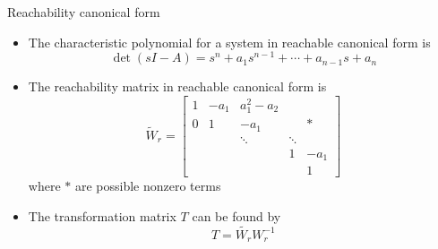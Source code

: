 \documentclass{beamer-control}
\begin{document}
\begin{frame}{Reachability canonical form}
\begin{itemize}
	\item The characteristic polynomial for a system in reachable canonical form is 
	\[\operatorname{det}(sI-A)= s^n+a_1s^{n-1}+\cdots + a_{n-1}s+a_n\]
	\item The reachability matrix in reachable canonical form is
	\[\tilde{W}_r = \begin{bmatrix}
		1 & -a_1 & a_1^2-a_2 & & \\
		0 & 1 & -a_1 & & * \\
		& & \ddots & \ddots & \\
		&  & & 1 & -a_1 \\
		& & & & 1
	\end{bmatrix}\]
	where $*$ are possible nonzero terms
	\item The transformation matrix $T$ can be found by 
	\[T=\tilde{W_r} W_r^{-1}\]
\end{itemize}
\end{frame}


\SUMMARYFRAME
\FINALE
\end{document}

